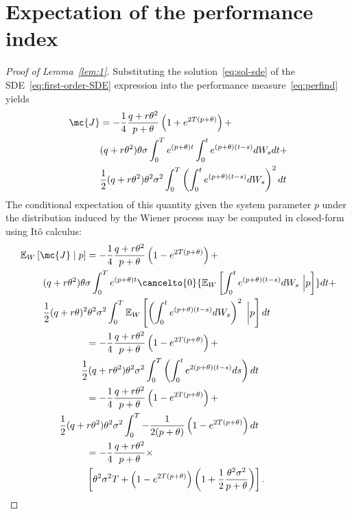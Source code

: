 \appendix

\section{Expectation of the performance index}
\label{sec:app_expectation}

\begin{proof}[Proof of Lemma~\ref{lem:1}]
%
Substituting the solution~\eqref{eq:sol-sde} of the
SDE~\eqref{eq:first-order-SDE} expression into the performance
measure~\eqref{eq:perfind} yields
%
\begin{align*} \mc{J} &=
-\frac{1}{4}\frac{q+r\theta^2}{p+\theta}\left(1 +
        e^{2T(p+\theta)}\right) + \\ &
        (q+r\theta^2)\theta\sigma \int_0^T
        e^{(p+\theta)t} \int_0^t e^{(p+\theta)(t-s)}dW_s
        dt + \\ & \frac{1}{2}(q+r\theta^2)\theta^2
        \sigma^2 \int_0^T \left( \int_0^t
e^{(p+\theta)(t-s)} dW_s  \right)^2 dt 
\end{align*}
%
The conditional expectation of this quantity given the system parameter $p$
under the distribution induced by the Wiener process may be computed in
closed-form using It\^{o} calculus:
%
\begin{align*} 
\mathbb{E}_W\left[\mc{J} \mid p \right]
&= -\frac{1}{4}\frac{q+r\theta^2}{p+\theta}\left(1 -
        e^{2T(p+\theta)}\right) + \\ &{~}\hspace{-17mm}
        (q+r\theta^2)\theta\sigma\int_0^Te^{(p+\theta)t}\cancelto{0}{\mathbb{E}_W\left[\int_0^t
e^{(p+\theta)(t-s)} dW_s~\Big\rvert p\right]} dt + \\
                                     &{~}\hspace{-17mm}
                                     \frac{1}{2}(q+r\theta)^2\theta^2\sigma^2\int_0^T\mathbb{E}_W\left[\left(\int_0^t
e^{(p+\theta)(t-s)} dW_s \right)^2~\bigg\rvert p\right] dt \\ &=
-\frac{1}{4}\frac{q+r\theta^2}{p+\theta}\left(1 -
e^{2T(p+\theta)}\right) + \\ &{~} \hspace{-3mm}
\frac{1}{2}(q+r\theta^2)\theta^2\sigma^2\int_0^T\left(\int_0^t
e^{2(p+\theta)(t-s)} ds \right) dt \\ &=
-\frac{1}{4}\frac{q+r\theta^2}{p+\theta}\left(1 - e^{2T(p+\theta)}\right) + \\
                                      &{~} \hspace{-11mm}
                                      \frac{1}{2}(q+r\theta^2)\theta^2\sigma^2\int_0^T
-\frac{1}{2(p+\theta)}\left(1 - e^{2T(p+\theta)}\right) dt \\ 
&=
-\frac{1}{4}\frac{q+r\theta^2}{p+\theta} \times \\ &\left[ \theta^2 \sigma^2 T +
\left(1 - e^{2T(p+\theta)}\right) \left(1 +
\frac{1}{2}\frac{\theta^2\sigma^2}{p+\theta}\right)\right].  
\end{align*}
%
\end{proof}



